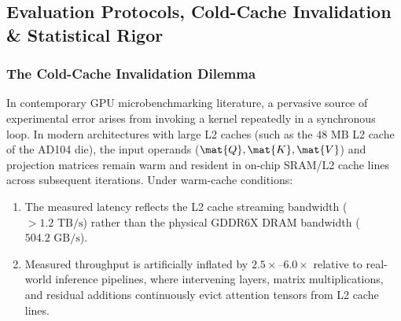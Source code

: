\subsection{Evaluation Protocols, Cold-Cache Invalidation \& Statistical Rigor}
\label{sec:setup_protocols_rigor}

\subsubsection{The Cold-Cache Invalidation Dilemma}
In contemporary GPU microbenchmarking literature, a pervasive source of experimental error arises from invoking a kernel repeatedly in a synchronous loop. In modern architectures with large L2 caches (such as the $48\text{ MB}$ L2 cache of the AD104 die), the input operands ($\mat{Q}, \mat{K}, \mat{V}$) and projection matrices remain warm and resident in on-chip SRAM/L2 cache lines across subsequent iterations. Under warm-cache conditions:
\begin{enumerate}
    \item The measured latency reflects the L2 cache streaming bandwidth ($> 1.2\text{ TB/s}$) rather than the physical GDDR6X DRAM bandwidth ($504.2\text{ GB/s}$).
    \item Measured throughput is artificially inflated by $2.5\times\text{--}6.0\times$ relative to real-world inference pipelines, where intervening layers, matrix multiplications, and residual additions continuously evict attention tensors from L2 cache lines.
\end{enumerate}

